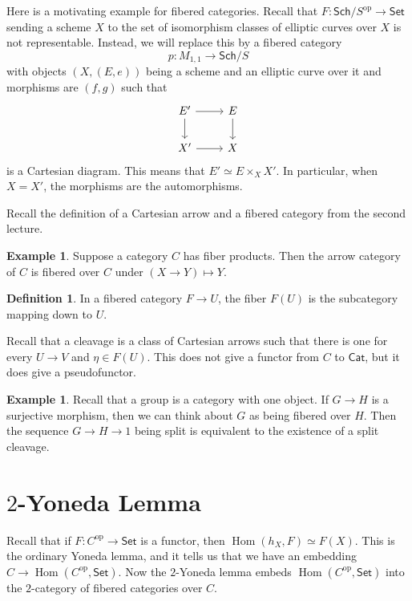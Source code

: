 \documentclass[leqno, openany]{memoir}
\theoremstyle{definition}
\newtheorem{defn}[thm]{Definition}
\newtheorem{exm}[thm]{Example}
\theoremstyle{remark}
\theoremstyle{plain}
\theoremstyle{definition}
\theoremstyle{remark}
\newcommand{\mr}[1]{\mathrm{#1}}
\newcommand{\ms}[1]{\mathsf{#1}}
\DeclareMathOperator{\Hom}{Hom}
\begin{document}
Here is a motivating example for fibered categories. Recall that $F \colon \ms{Sch}/S^{\mr{op}} \to \ms{Set}$ sending a scheme $X$ to the set of isomorphism classes of elliptic curves over $X$ is not representable. Instead, we will replace this by a fibered category
\[ p \colon M_{1,1} \to \ms{Sch}/S \]
with objects $(X, (E,e))$ being a scheme and an elliptic curve over it and morphisms are $(f,g)$ such that
\begin{equation*}
\begin{tikzcd}
    E' \arrow{r} \arrow{d} & E \arrow{d} \\
    X' \arrow{r} & X
\end{tikzcd}
\end{equation*}
is a Cartesian diagram. This means that $E' \simeq E \times_X X'$. In particular, when $X = X'$, the morphisms are the automorphisms.

Recall the definition of a Cartesian arrow and a fibered category from the second lecture. 

\begin{exm}
    Suppose a category $C$ has fiber products. Then the arrow category of $C$ is fibered over $C$ under $(X \to Y) \mapsto Y$.
\end{exm}

\begin{defn}
    In a fibered category $F \to U$, the fiber $F(U)$ is the subcategory mapping down to $U$.
\end{defn}

Recall that a cleavage is a class of Cartesian arrows such that there is one for every $U \to V$ and $\eta \in F(U)$. This does not give a functor from $C$ to $\ms{Cat}$, but it does give a pseudofunctor. 

\begin{exm}
    Recall that a group is a category with one object. If $G \to H$ is a surjective morphism, then we can think about $G$ as being fibered over $H$. Then the sequence $G \to H \to 1$ being split is equivalent to the existence of a split cleavage.
\end{exm}

\section{$2$-Yoneda Lemma}%
\label{sec:_2_yoneda_lemma}

Recall that if $F \colon C^{\mr{op}} \to \ms{Set}$ is a functor, then $\Hom(h_X, F) \simeq F(X)$. This is the ordinary Yoneda lemma, and it tells us that we have an embedding $C \to \Hom(C^{\mr{op}}, \ms{Set})$. Now the $2$-Yoneda lemma embeds $\Hom(C^{\mr{op}}, \ms{Set})$ into the $2$-category of fibered categories over $C$.
\end{document}
